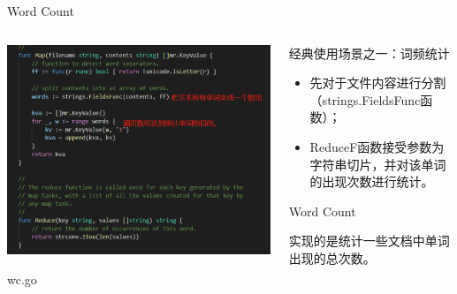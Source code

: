 \begin{frame}{Word Count}
	
	\begin{columns}
		\begin{column}{0.5\textwidth}
			\centerline{\includegraphics[width = 1.1\textwidth]{Figures/wc.png}}
			\centerline{wc.go
			}
		\end{column}
		
		\begin{column}{0.5\textwidth}
			\begin{CJK}{UTF8}{gkai}
			经典使用场景之一：词频统计
			\end{CJK}
			\begin{itemize}
				\item \begin{CJK}{UTF8}{gkai}
					先对于文件内容进行分割（strings.FieldsFunc函数）；
				\end{CJK}
				
				\item \begin{CJK}{UTF8}{gkai}
					ReduceF函数接受参数为字符串切片，并对该单词的出现次数进行统计。
				\end{CJK}
				
			\end{itemize}
			\begin{block}{Word Count}
				\begin{CJK}{UTF8}{gkai}
					实现的是统计一些文档中单词出现的总次数。
				\end{CJK}
			\end{block}
		\end{column}
		
		
	\end{columns}
	
\end{frame}

